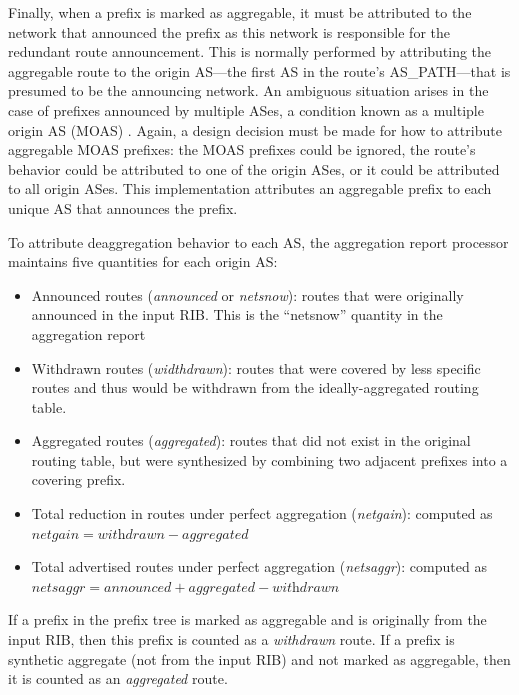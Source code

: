 
Finally, when a prefix is marked as aggregable, it must be attributed to the
network that announced the prefix as this network is responsible for the
redundant route announcement. This is normally performed by attributing the
aggregable route to the origin AS---the first AS in the route's AS\_PATH---that
is presumed to be the announcing network. An ambiguous situation arises in the
case of prefixes announced by multiple ASes, a condition known as a multiple
origin AS (MOAS) \cite{Zhao:2001ly}. Again, a design decision must be made for
how to attribute aggregable MOAS prefixes: the MOAS prefixes could be ignored,
the route's behavior could be attributed to one of the origin ASes, or it could
be attributed to all origin ASes. This implementation attributes an aggregable
prefix to each unique AS that announces the prefix.

To attribute deaggregation behavior to each AS, the aggregation report
processor maintains five quantities for each origin AS:

\begin{itemize}
    \item{Announced routes (\emph{announced} or \emph{netsnow}): routes that
    were originally announced in the input RIB. This is the ``netsnow''
    quantity in the aggregation report}
    \item{Withdrawn routes (\emph{widthdrawn}): routes that were covered by
    less specific routes and thus would be withdrawn from the
    ideally-aggregated routing table.}
    \item{Aggregated routes (\emph{aggregated}): routes that did not exist in
    the original routing table, but were synthesized by combining two adjacent
    prefixes into a covering prefix.}
    \item{Total reduction in routes under perfect aggregation (\emph{netgain}):
    computed as $\textit{netgain} = \textit{withdrawn} - \textit{aggregated}$}
    \item{Total advertised routes under perfect aggregation (\emph{netsaggr}):
    computed as $\textit{netsaggr}=\textit{announced} + \textit{aggregated} -
    \textit{withdrawn}$}
\end{itemize}

If a prefix in the prefix tree is marked as aggregable and is originally from
the input RIB, then this prefix is counted as a \emph{withdrawn} route. If a
prefix is synthetic aggregate (not from the input RIB) and not marked as
aggregable, then it is counted as an \emph{aggregated} route.

